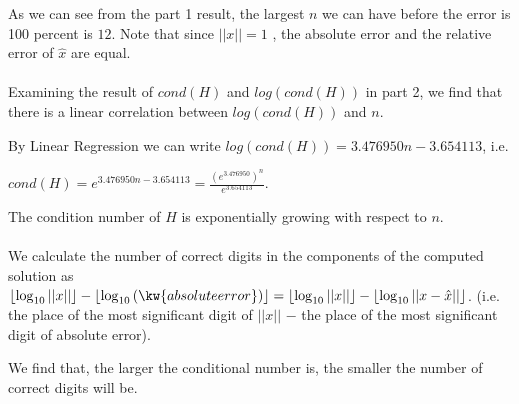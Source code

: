 \documentclass[11pt, answers]{exam}
\theoremstyle{plain}
\theoremstyle{definition}
\begin{document}
\begin{questions}
\question %
As we can see from the part 1 result, the largest $n$ we can have before the error is 100 percent is $12$. Note that since $||x||=1$ , the absolute error and the relative error of $\hat{x}$ are equal.
\\
\\
Examining the result of $cond(H)$ and $log(cond(H))$ in part 2, we find that there is a linear correlation between $log(cond(H))$ and $n$. 

By Linear Regression we can write $log(cond(H)) = 3.476950n-3.654113$, i.e. 

$cond(H) = e^{3.476950n-3.654113} = \frac{(e^{3.476950})^n}{e^{3.654113}}$. 

The condition number of $H$ is exponentially growing with respect to $n$.
\\
\\
We calculate the number of correct digits in the components of the computed solution as $\lfloor\log_{10}{||x||}\rfloor - \lfloor\log_{10}{(\kw{absolute error})}\rfloor = \lfloor\log_{10}{||x||}\rfloor - \lfloor\log_{10}{||x-\hat{x}||}\rfloor$. (i.e. the place of the most significant digit of $||x||$ $-$ the place of the most significant digit of absolute error).

We find that, the larger the conditional number is, the smaller the number of correct digits will be.


\end{questions}
\end{document}
